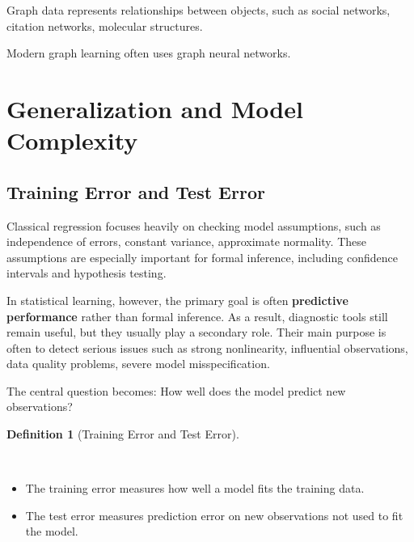 \documentclass[
  letterpaper,
  DIV=11,
  numbers=noendperiod]{scrreprt}
\providecommand{\tightlist}{%
  \setlength{\itemsep}{0pt}\setlength{\parskip}{0pt}}
\theoremstyle{definition}
\newtheorem{definition}{Definition}[chapter]
\theoremstyle{definition}
\theoremstyle{plain}
\theoremstyle{plain}
\theoremstyle{remark}
\begin{document}
\begin{tcolorbox}[enhanced jigsaw, arc=.35mm, bottomrule=.15mm, bottomtitle=1mm, breakable, colback=white, colbacktitle=quarto-callout-note-color!10!white, colframe=quarto-callout-note-color-frame, coltitle=black, left=2mm, leftrule=.75mm, opacityback=0, opacitybacktitle=0.6, rightrule=.15mm, title=\textcolor{quarto-callout-note-color}{\faInfo}\hspace{0.5em}{Graph Data}, titlerule=0mm, toprule=.15mm, toptitle=1mm]

Graph data represents relationships between objects, such as social
networks, citation networks, molecular structures.

Modern graph learning often uses graph neural networks.

\end{tcolorbox}

\section{Generalization and Model
Complexity}\label{generalization-and-model-complexity}

\subsection{Training Error and Test
Error}\label{training-error-and-test-error}

Classical regression focuses heavily on checking model assumptions, such
as independence of errors, constant variance, approximate normality.
These assumptions are especially important for formal inference,
including confidence intervals and hypothesis testing.

In statistical learning, however, the primary goal is often
\textbf{predictive performance} rather than formal inference. As a
result, diagnostic tools still remain useful, but they usually play a
secondary role. Their main purpose is often to detect serious issues
such as strong nonlinearity, influential observations, data quality
problems, severe model misspecification.

The central question becomes: How well does the model predict new
observations?

\begin{definition}[Training Error and Test
Error]\protect\hypertarget{def-training-error}{}\label{def-training-error}

~

\begin{itemize}
\tightlist
\item
  The training error measures how well a model fits the training data.
\item
  The test error measures prediction error on new observations not used
  to fit the model.
\end{itemize}

\end{definition}
\end{document}
